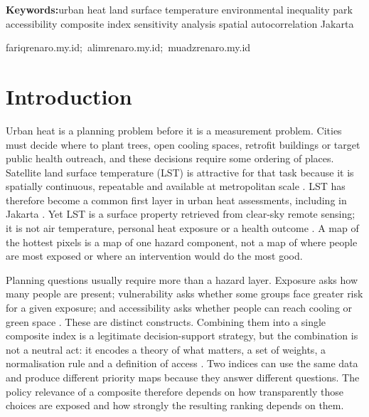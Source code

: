 \documentclass[times,twoside]{_Templates/MultiTargetManuscript}
\begin{document}
\begin{keywords}
\textbf{Keywords:}\quad urban heat \textbar{} land surface temperature \textbar{} environmental inequality \textbar{} park accessibility \textbar{} composite index \textbar{} sensitivity analysis \textbar{} spatial autocorrelation \textbar{} Jakarta
\end{keywords}

\begin{corrauthor}
fariq\at renaro.my.id;\ alim\at renaro.my.id;\ muadz\at renaro.my.id
\end{corrauthor}

\section{Introduction}

Urban heat is a planning problem before it is a measurement problem. Cities
must decide where to plant trees, open cooling spaces, retrofit buildings or
target public health outreach, and these decisions require some ordering of
places. Satellite land surface temperature (LST) is attractive for that task
because it is spatially continuous, repeatable and available at metropolitan
scale \citep{oke1982,voogt2003}. LST has therefore become a common first layer in
urban heat assessments, including in Jakarta \citep{siswanto2023,putra2021,rizki2024}.
Yet LST is a surface property retrieved from clear-sky remote sensing; it is not
air temperature, personal heat exposure or a health outcome
\citep{schwarz2012,voogt2003}. A map of the hottest pixels is a map of one
hazard component, not a map of where people are most exposed or where an
intervention would do the most good.

Planning questions usually require more than a hazard layer. Exposure asks how
many people are present; vulnerability asks whether some groups face greater
risk for a given exposure; and accessibility asks whether people can reach
cooling or green space \citep{reid2009,wolf2013,harlan2006}. These are distinct
constructs. Combining them into a single composite index is a legitimate
decision-support strategy, but the combination is not a neutral act: it encodes
a theory of what matters, a set of weights, a normalisation rule and a
definition of access \citep{malczewski2006,saisana2005,greco2019}. Two indices
can use the same data and produce different priority maps because they answer
different questions. The policy relevance of a composite therefore depends on
how transparently those choices are exposed and how strongly the resulting
ranking depends on them.
\end{document}

